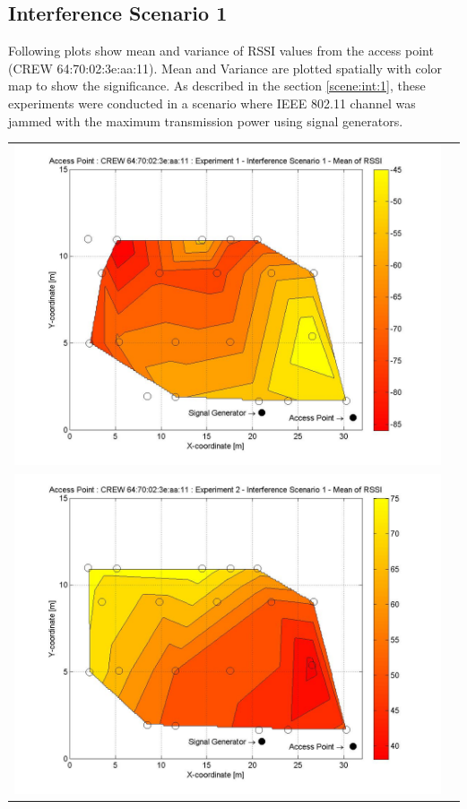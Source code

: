 \documentclass[11pt,a4paper,headinclude,footinclude,chapterprefix=on]{scrreprt}
\begin{document}
\subsection{Interference Scenario 1} 
Following plots show mean and variance of RSSI values from the access point (CREW 64:70:02:3e:aa:11). Mean and Variance are plotted spatially with color map to show the significance. As described in the section \ref{scene:int:1}, these experiments were conducted in a scenario where IEEE 802.11 channel was jammed with the maximum transmission power using signal generators.
\begin{longtable}
	{lr} 
	\includegraphics[width=13cm]{../../Source/plot/CREW_11/11_Sig_Ex_1_Mean.jpg} \\
	\includegraphics[width=13cm]{../../Source/plot/CREW_11/11_Sig_Ex_2_Mean.jpg} \\

\end{longtable}
\end{document}
